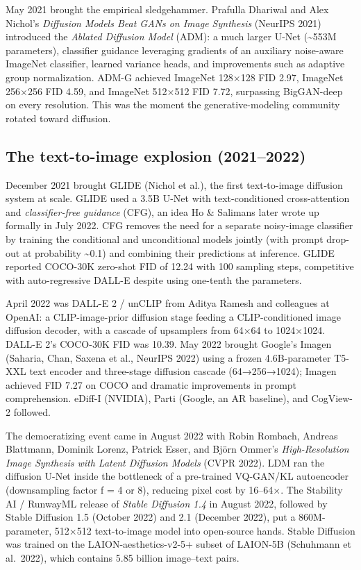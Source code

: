 May 2021 brought the empirical sledgehammer. Prafulla Dhariwal and Alex Nichol's \emph{Diffusion Models Beat GANs on Image Synthesis} (NeurIPS 2021) introduced the \emph{Ablated Diffusion Model} (ADM): a much larger U-Net (\textasciitilde553M parameters), classifier guidance leveraging gradients of an auxiliary noise-aware ImageNet classifier, learned variance heads, and improvements such as adaptive group normalization. ADM-G achieved ImageNet 128×128 FID 2.97, ImageNet 256×256 FID 4.59, and ImageNet 512×512 FID 7.72, surpassing BigGAN-deep on every resolution. This was the moment the generative-modeling community rotated toward diffusion.

\subsection{The text-to-image explosion (2021--2022)}\label{the-text-to-image-explosion-20212022}

December 2021 brought GLIDE (Nichol et al.), the first text-to-image diffusion system at scale. GLIDE used a 3.5B U-Net with text-conditioned cross-attention and \emph{classifier-free guidance} (CFG), an idea Ho \& Salimans later wrote up formally in July 2022. CFG removes the need for a separate noisy-image classifier by training the conditional and unconditional models jointly (with prompt drop-out at probability \textasciitilde0.1) and combining their predictions at inference. GLIDE reported COCO-30K zero-shot FID of 12.24 with 100 sampling steps, competitive with auto-regressive DALL-E despite using one-tenth the parameters.

April 2022 was DALL-E 2 / unCLIP from Aditya Ramesh and colleagues at OpenAI: a CLIP-image-prior diffusion stage feeding a CLIP-conditioned image diffusion decoder, with a cascade of upsamplers from 64×64 to 1024×1024. DALL-E 2's COCO-30K FID was 10.39. May 2022 brought Google's Imagen (Saharia, Chan, Saxena et al., NeurIPS 2022) using a frozen 4.6B-parameter T5-XXL text encoder and three-stage diffusion cascade (64→256→1024); Imagen achieved FID 7.27 on COCO and dramatic improvements in prompt comprehension. eDiff-I (NVIDIA), Parti (Google, an AR baseline), and CogView-2 followed.

The democratizing event came in August 2022 with Robin Rombach, Andreas Blattmann, Dominik Lorenz, Patrick Esser, and Björn Ommer's \emph{High-Resolution Image Synthesis with Latent Diffusion Models} (CVPR 2022). LDM ran the diffusion U-Net inside the bottleneck of a pre-trained VQ-GAN/KL autoencoder (downsampling factor f = 4 or 8), reducing pixel cost by 16--64×. The Stability AI / RunwayML release of \emph{Stable Diffusion 1.4} in August 2022, followed by Stable Diffusion 1.5 (October 2022) and 2.1 (December 2022), put a 860M-parameter, 512×512 text-to-image model into open-source hands. Stable Diffusion was trained on the LAION-aesthetics-v2-5+ subset of LAION-5B (Schuhmann et al.~2022), which contains 5.85 billion image--text pairs.


